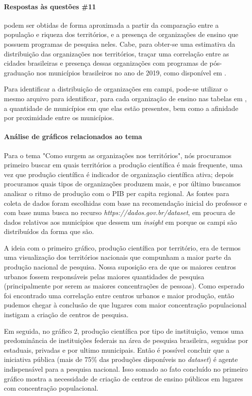 \paragraph{Respostas às questões \#11}
podem ser obtidas de forma aproximada a partir da comparação entre a população e riqueza dos territórios, e a presença de organizações de ensino que possuem programas de pesquisa neles. Cabe, para obter-se uma estimativa da distribuição das organizações nos territórios, traçar uma correlação entre as cidades brasileiras e  presença dessas organizações com programas de pós-graduação nos municípios brasileiros no ano de 2019, como disponível em \cite{capes_programas_2021}. 

Para identificar a distribuição de organizações em campi, pode-se utilizar o mesmo arquivo para identificar, para cada organização de ensino nas tabelas em  \cite{capes_programas_2021}, a quantidade de municípios em que elas estão presentes, bem como a afinidade por proximidade entre os municípios.

\paragraph{Análise de gráficos relacionados ao tema}
Para o tema "Como surgem as organizações nos territórios", nós procuramos primeiro buscar em quais territórios a produção científica é mais frequente, uma vez que produção científica é indicador de organização científica ativa; depois procuramos quais tipos de organizações produzem mais, e por último buscamos analisar o ritmo de produção com o PIB per capita regional. As fontes para coleta de dados foram escolhidas com base na recomendação inicial do professor e com base numa busca no recurso \textit{https://dados.gov.br/dataset}, em procura de dados relativos aos municípios que dessem um \textit{insight} em porque os campi são distribuídos da forma que são.

A ideia com o primeiro gráfico, produção científica por território, era de termos uma visualização dos territórios nacionais que compunham a maior parte da produção nacional de pesquisa. Nossa suposição era de que os maiores centros urbanos fossem responsáveis pelas maiores quantidades de pesquisa (principalmente por serem as maiores concentrações de pessoas). Como esperado foi encontrado uma correlação entre centros urbanos e maior produção, então pudemos chegar à conclusão de que lugares com maior concentração populacional instigam a criação de centros de pesquisa. 

Em seguida, no gráfico 2, produção científica por tipo de instituição, vemos uma predominância de instituições federais na área de pesquisa brasileira, seguidas por estaduais, privadas e por ultimo municipais. Então é possível concluir que a iniciativa pública (mais de 75\% das produções disponíveis no \textit{dataset}) é agente indispensável para a pesquisa nacional. Isso somado ao fato concluído no primeiro gráfico mostra a necessidade de criação de centros de ensino públicos em lugares com concentração populacional.

